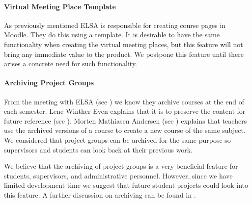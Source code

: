 \paragraph{Virtual Meeting Place Template}
As previously mentioned ELSA is responsible for creating course pages in Moodle. 
They do this using a template. 
It is desirable to have the same functionality when creating the virtual meeting places, but this feature will not bring any immediate value to the product. 
We postpone this feature until there arises a concrete need for such functionality.

\paragraph{Archiving Project Groups}
\label{sub:analysarchiving}
From the meeting with ELSA (see ) we know they archive courses at the end of each semester. 
Lene Winther Even explains that it is to preserve the content for future reference (see ). 
Morten Mathiasen Andersen (see ) explains that teachers use the archived versions of a course to create a new course of the same subject. 
We considered that project groups can be archived for the same purpose so supervisors and students can look back at their previous work.

We believe that the archiving of project groups is a very beneficial feature for students, supervisors, and administrative personnel.
However, since we have limited development time we suggest that future student projects could look into this feature.
A further discussion on archiving can be found in .\\


